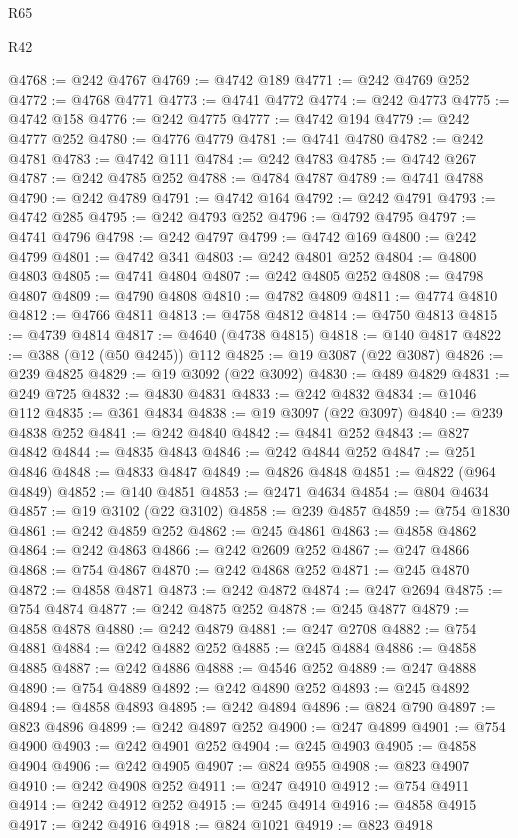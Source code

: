 \begin{lexlean}{R65}
\begin{lexlean}{R42}
\begin{coremodule}
{{{{{{{{{{{{{{{{{{{{{{{{{{{{{{{{{{{{{{{{{{{{{{{{{{{{{{{{{{{{{{{{{{{{{{{{{{{{{{{{{{{{{{{{{{{{{{{{{{{{{{{{{{{{{{{{{{{{{{{{{{{{{{{{{{{{{{{{{{{{{{{{{{{{{{{{{{{{{{{{{{{{{{{{{{{{{{{{{{{{{{{{@4768 := @242 @4767
@4769 := @4742 @189
@4771 := @242 @4769 @252
@4772 := @4768 @4771
@4773 := @4741 @4772
@4774 := @242 @4773
@4775 := @4742 @158
@4776 := @242 @4775
@4777 := @4742 @194
@4779 := @242 @4777 @252
@4780 := @4776 @4779
@4781 := @4741 @4780
@4782 := @242 @4781
@4783 := @4742 @111
@4784 := @242 @4783
@4785 := @4742 @267
@4787 := @242 @4785 @252
@4788 := @4784 @4787
@4789 := @4741 @4788
@4790 := @242 @4789
@4791 := @4742 @164
@4792 := @242 @4791
@4793 := @4742 @285
@4795 := @242 @4793 @252
@4796 := @4792 @4795
@4797 := @4741 @4796
@4798 := @242 @4797
@4799 := @4742 @169
@4800 := @242 @4799
@4801 := @4742 @341
@4803 := @242 @4801 @252
@4804 := @4800 @4803
@4805 := @4741 @4804
@4807 := @242 @4805 @252
@4808 := @4798 @4807
@4809 := @4790 @4808
@4810 := @4782 @4809
@4811 := @4774 @4810
@4812 := @4766 @4811
@4813 := @4758 @4812
@4814 := @4750 @4813
@4815 := @4739 @4814
@4817 := @4640 (@4738 @4815)
@4818 := @140 @4817
@4822 := @388 (@12 (@50 @4245)) @112
@4825 := @19 @3087 (@22 @3087)
@4826 := @239 @4825
@4829 := @19 @3092 (@22 @3092)
@4830 := @489 @4829
@4831 := @249 @725
@4832 := @4830 @4831
@4833 := @242 @4832
@4834 := @1046 @112
@4835 := @361 @4834
@4838 := @19 @3097 (@22 @3097)
@4840 := @239 @4838 @252
@4841 := @242 @4840
@4842 := @4841 @252
@4843 := @827 @4842
@4844 := @4835 @4843
@4846 := @242 @4844 @252
@4847 := @251 @4846
@4848 := @4833 @4847
@4849 := @4826 @4848
@4851 := @4822 (@964 @4849)
@4852 := @140 @4851
@4853 := @2471 @4634
@4854 := @804 @4634
@4857 := @19 @3102 (@22 @3102)
@4858 := @239 @4857
@4859 := @754 @1830
@4861 := @242 @4859 @252
@4862 := @245 @4861
@4863 := @4858 @4862
@4864 := @242 @4863
@4866 := @242 @2609 @252
@4867 := @247 @4866
@4868 := @754 @4867
@4870 := @242 @4868 @252
@4871 := @245 @4870
@4872 := @4858 @4871
@4873 := @242 @4872
@4874 := @247 @2694
@4875 := @754 @4874
@4877 := @242 @4875 @252
@4878 := @245 @4877
@4879 := @4858 @4878
@4880 := @242 @4879
@4881 := @247 @2708
@4882 := @754 @4881
@4884 := @242 @4882 @252
@4885 := @245 @4884
@4886 := @4858 @4885
@4887 := @242 @4886
@4888 := @4546 @252
@4889 := @247 @4888
@4890 := @754 @4889
@4892 := @242 @4890 @252
@4893 := @245 @4892
@4894 := @4858 @4893
@4895 := @242 @4894
@4896 := @824 @790
@4897 := @823 @4896
@4899 := @242 @4897 @252
@4900 := @247 @4899
@4901 := @754 @4900
@4903 := @242 @4901 @252
@4904 := @245 @4903
@4905 := @4858 @4904
@4906 := @242 @4905
@4907 := @824 @955
@4908 := @823 @4907
@4910 := @242 @4908 @252
@4911 := @247 @4910
@4912 := @754 @4911
@4914 := @242 @4912 @252
@4915 := @245 @4914
@4916 := @4858 @4915
@4917 := @242 @4916
@4918 := @824 @1021
@4919 := @823 @4918
}}}}}}}}}}}}}}}}}}}}}}}}}}}}}}}}}}}}}}}}}}}}}}}}}}}}}}}}}}}}}}}}}}}}}}}}}}}}}}}}}}}}}}}}}}}}}}}}}}}}}}}}}}}}}}}}}}}}}}}}}}}}}}}}}}}}}}}}}}}}}}}}}}}}}}}}}}}}}}}}}}}}}}}}}}}}}}}}}}}}}}}}
\end{coremodule}
\end{lexlean}
\end{lexlean}
